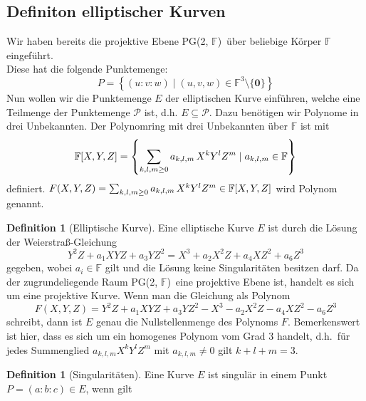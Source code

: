 \documentclass[hidelinks]{article}
\theoremstyle{plain}
\theoremstyle{definition}
\newtheorem{defn}[thm]{Definition}
\theoremstyle{rem}
\newcommand{\pgtwo}{PG(2, $\mathbb{F}$)\ }
\newcommand{\ftnz}{\mathbb{F}^{3}\setminus\{\boldsymbol 0\}}
\begin{document}
\begin{sloppypar}
\subsection{Definiton elliptischer Kurven} \label{definition-ek}
Wir haben bereits die projektive Ebene \pgtwo über beliebige Körper $\mathbb{F}$ eingeführt.\\
Diese hat die folgende Punktemenge:
\begin{equation*}
    P = \left\{(u:v:w) \mid (u,v,w) \in \ftnz \right\}
\end{equation*}
Nun wollen wir die Punktemenge $E$ der elliptischen Kurve einführen, welche eine Teilmenge der Punktemenge $\mathcal{P}$ ist, d.h. $E \subseteq \mathcal{P}$. 
Dazu benötigen wir Polynome in drei Unbekannten.
Der Polynomring mit drei Unbekannten über $\mathbb{F}$ ist mit 
\begin{equation*}
    \mathbb{F}[X,Y,Z] = \left\{ \sum_{k,l,m \geq 0} a_{k,l,m} \thinspace X^k Y^l Z^m \mid a_{k,l,m} \in \mathbb{F} \right\}
\end{equation*}
definiert. 
$F(X,Y,Z) = \sum_{k,l,m \geq 0} a_{k,l,m} \thinspace X^k Y^l Z^m \in \mathbb{F}[X,Y,Z]$ wird Polynom genannt. 
\begin{defn}[Elliptische Kurve] \label{weierstrass}
    Eine elliptische Kurve $E$ ist durch die Lösung der Weierstraß-Gleichung 
    \begin{equation*}
        Y^2Z + a_1XYZ + a_3YZ^2 = X^3 + a_2X^2Z + a_4XZ^2 + a_6Z^3
    \end{equation*}
    gegeben, wobei $a_i \in \mathbb{F}$ gilt und die Lösung keine Singularitäten besitzen darf.\cite[Seite~54]{milne2006}
    Da der zugrundeliegende Raum \pgtwo eine projektive Ebene ist, handelt es sich um eine projektive Kurve. 
    Wenn man die Gleichung als Polynom 
    \begin{equation*}
        F(X,Y,Z) = Y^2Z + a_1XYZ + a_3YZ^2 - X^3 - a_2X^2Z - a_4XZ^2 -a_6Z^3
    \end{equation*}
    schreibt, dann ist $E$ genau die Nullstellenmenge des Polynoms $F$. Bemerkenswert ist hier, dass es sich um ein homogenes Polynom vom Grad 3 handelt, d.h.\ für jedes Summenglied $a_{k,l,m}X^kY^lZ^m$ mit $a_{k,l,m} \neq 0$ gilt $k + l + m = 3$.
\end{defn}
\begin{defn}[Singularitäten]
	Eine Kurve $E$ ist singulär in einem Punkt \mbox{$P=(a:b:c)\in E$}, wenn gilt
    \begin{equation*}

\end{equation*}
\end{defn}
\end{sloppypar}
\end{document}
